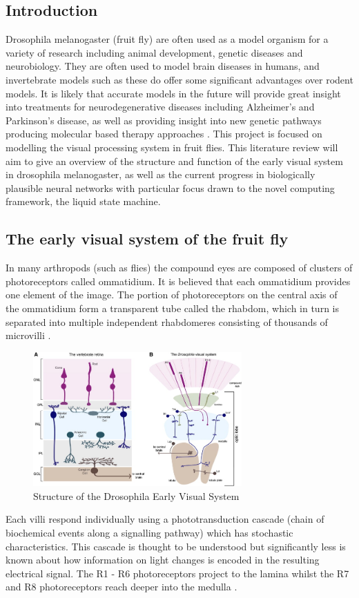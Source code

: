 \documentclass[fleqn,12pt]{wlscirep}
\begin{document}
\subsection*{Introduction}
Drosophila melanogaster (fruit fly) are often used as a model organism for a variety of research including animal development, genetic diseases and neurobiology. They are often used to model brain diseases in humans, and invertebrate models such as these do offer some significant advantages over rodent models. It is likely that accurate models in the future will provide great insight into treatments for neurodegenerative diseases including Alzheimer's and Parkinson's disease, as well as providing insight into new genetic pathways producing molecular based therapy approaches \cite{jeibmann_drosophila_2009}. This project is focused on modelling the visual processing system in fruit flies. This literature review will aim to give an overview of the structure and function of the early visual system in drosophila melanogaster, as well as the current progress in biologically plausible neural networks with particular focus drawn to the novel computing framework, the liquid state machine.


\subsection*{The early visual system of the fruit fly}
In many arthropods (such as flies) the compound eyes are composed of clusters of photoreceptors called ommatidium. It is believed that each ommatidium provides one element of the image. The portion of photoreceptors on the central axis of the ommatidium form a transparent tube called the rhabdom, which in turn is separated into multiple independent rhabdomeres consisting of thousands of microvilli \cite{song_stochastic_2012}. 
\begin{figure}
    \includegraphics[width=8cm]{flyVisSys.jpg}
    \centering
    \caption{Structure of the Drosophila Early Visual System\cite{erclik_eye_2009}}
    \label{fig:structure}
\end{figure}
Each villi respond individually using a phototransduction cascade (chain of biochemical events along a signalling pathway) which has stochastic characteristics. This cascade is thought to be understood \cite{kiselev_molecular_2000} but significantly less is known about how information on light changes is encoded in the resulting electrical signal.
The R1 - R6 photoreceptors project to the lamina whilst the R7 and R8 photoreceptors reach deeper into the medulla \cite{zhu_drosophila_2013}. 
\end{document}
